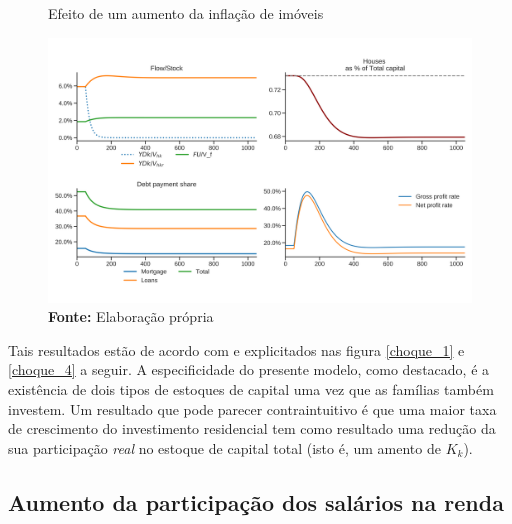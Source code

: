 \begin{figure}[H]
	\centering
	\caption{Efeito de um aumento da inflação de imóveis}
	\label{choque_4Norms}
	\includegraphics[width=\textwidth]{../../Modelo/Versoes/Shock_4Norms.png}
	\caption*{\textbf{Fonte:} Elaboração própria}
\end{figure}



Tais resultados estão de acordo com \textcite{freitas_growth_2015} e explicitados nas figura \ref{choque_1} e \ref{choque_4} a seguir. A especificidade do presente modelo, como destacado, é a existência de dois tipos de estoques de capital uma vez que as famílias também investem. Um resultado que pode parecer contraintuitivo é que uma maior taxa de crescimento do investimento residencial tem como resultado uma redução  da sua participação \textit{real} no estoque de capital total (isto é, um amento de $K_k$). 

\subsection*{Aumento da participação dos salários na renda}

